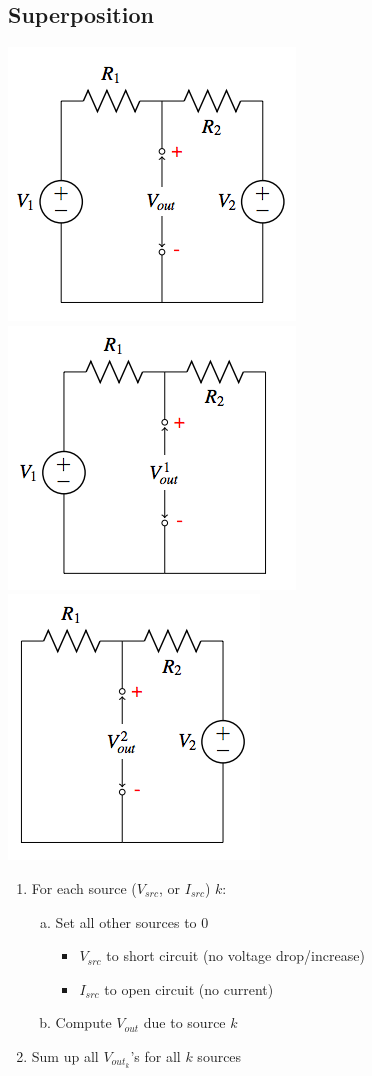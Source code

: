 \documentclass{article}\usepackage{amsmath,amssymb,amsthm,tikz,tkz-graph,color,chngpage,soul,hyperref,csquotes,graphicx,floatrow}\newcommand*{\QEDB}{\hfill\ensuremath{\square}}\newtheorem*{prop}{Proposition}\renewcommand{\theenumi}{\alph{enumi}}\usepackage[shortlabels]{enumitem}\usepackage[nobreak=true]{mdframed}\usetikzlibrary{matrix,calc}\MakeOuterQuote{"}\usepackage[margin=0.75in]{geometry} \newtheorem{theorem}{Theorem}
\begin{document}
\subsection*{Superposition}
\begin{center}\includegraphics{spf}\includegraphics{sp1}\includegraphics{sp2}\end{center}
\begin{enumerate}[1.]
    \item For each source ($V_{src}$, or $I_{src}$) $k$:
    \begin{enumerate}[a.]
        \item Set all other sources to 0
        \begin{itemize}
            \item $V_{src}$ to short circuit (no voltage drop/increase)
            \item $I_{src}$ to open circuit (no current)
        \end{itemize}
        \item Compute $V_{out}$ due to source $k$
    \end{enumerate}
    \item Sum up all $V_{out_k}$'s for all $k$ sources
\end{enumerate}
\end{document}
